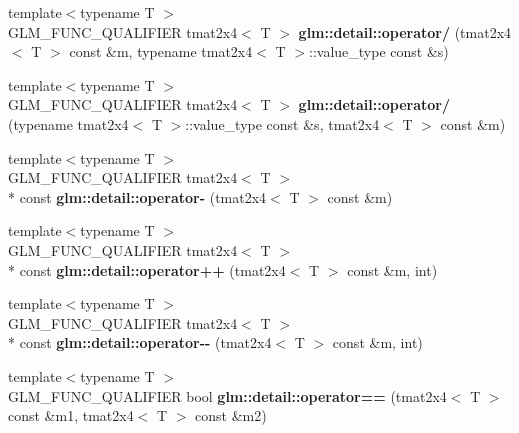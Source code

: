 \begin{DoxyCompactItemize}
\item 
\hypertarget{namespaceglm_1_1detail_abb99f6f388a96ad5797dca045610b57b}{{\footnotesize template$<$typename T $>$ }\\G\-L\-M\-\_\-\-F\-U\-N\-C\-\_\-\-Q\-U\-A\-L\-I\-F\-I\-E\-R tmat2x4$<$ T $>$ {\bfseries glm\-::detail\-::operator/} (tmat2x4$<$ T $>$ const \&m, typename tmat2x4$<$ T $>$\-::value\-\_\-type const \&s)}\label{namespaceglm_1_1detail_abb99f6f388a96ad5797dca045610b57b}

\item 
\hypertarget{namespaceglm_1_1detail_a518f1f3078503dbc3705a1af12856684}{{\footnotesize template$<$typename T $>$ }\\G\-L\-M\-\_\-\-F\-U\-N\-C\-\_\-\-Q\-U\-A\-L\-I\-F\-I\-E\-R tmat2x4$<$ T $>$ {\bfseries glm\-::detail\-::operator/} (typename tmat2x4$<$ T $>$\-::value\-\_\-type const \&s, tmat2x4$<$ T $>$ const \&m)}\label{namespaceglm_1_1detail_a518f1f3078503dbc3705a1af12856684}

\item 
\hypertarget{namespaceglm_1_1detail_afb8d51d85044dc70a1793fe659514f72}{{\footnotesize template$<$typename T $>$ }\\G\-L\-M\-\_\-\-F\-U\-N\-C\-\_\-\-Q\-U\-A\-L\-I\-F\-I\-E\-R tmat2x4$<$ T $>$\\*
 const {\bfseries glm\-::detail\-::operator-\/} (tmat2x4$<$ T $>$ const \&m)}\label{namespaceglm_1_1detail_afb8d51d85044dc70a1793fe659514f72}

\item 
\hypertarget{namespaceglm_1_1detail_ad61346ffce65066d622042d648693fb0}{{\footnotesize template$<$typename T $>$ }\\G\-L\-M\-\_\-\-F\-U\-N\-C\-\_\-\-Q\-U\-A\-L\-I\-F\-I\-E\-R tmat2x4$<$ T $>$\\*
 const {\bfseries glm\-::detail\-::operator++} (tmat2x4$<$ T $>$ const \&m, int)}\label{namespaceglm_1_1detail_ad61346ffce65066d622042d648693fb0}

\item 
\hypertarget{namespaceglm_1_1detail_a0910a14e633c8909b558f8bcf934a4e6}{{\footnotesize template$<$typename T $>$ }\\G\-L\-M\-\_\-\-F\-U\-N\-C\-\_\-\-Q\-U\-A\-L\-I\-F\-I\-E\-R tmat2x4$<$ T $>$\\*
 const {\bfseries glm\-::detail\-::operator-\/-\/} (tmat2x4$<$ T $>$ const \&m, int)}\label{namespaceglm_1_1detail_a0910a14e633c8909b558f8bcf934a4e6}

\item 
\hypertarget{namespaceglm_1_1detail_ac198d1c5283e3e7c2076c4b6a9f235b1}{{\footnotesize template$<$typename T $>$ }\\G\-L\-M\-\_\-\-F\-U\-N\-C\-\_\-\-Q\-U\-A\-L\-I\-F\-I\-E\-R bool {\bfseries glm\-::detail\-::operator==} (tmat2x4$<$ T $>$ const \&m1, tmat2x4$<$ T $>$ const \&m2)}\label{namespaceglm_1_1detail_ac198d1c5283e3e7c2076c4b6a9f235b1}


\end{DoxyCompactItemize}
